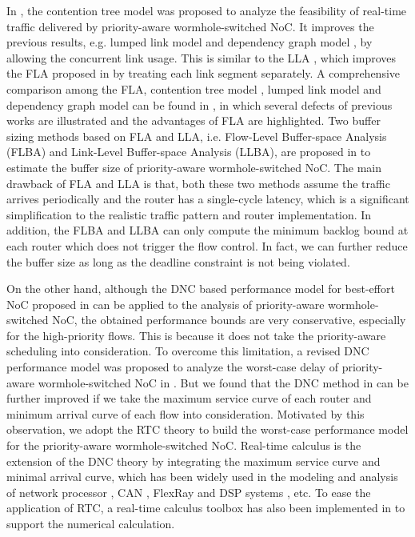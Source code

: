\documentclass[10pt,journal]{IEEEtran}
\begin{document}
In \cite{LuJS05}, the contention tree model was proposed to analyze the feasibility of real-time traffic delivered by priority-aware wormhole-switched NoC. It improves the previous results, e.g. lumped link model \cite{707545} and dependency graph model \cite{708526}, by allowing the concurrent link usage. This is similar to the LLA \cite{73}, which improves the FLA proposed in \cite{Shi:2008:RCA:1397757.1397996} by treating each link segment separately. A comprehensive comparison among the FLA, contention tree model \cite{LuJS05}, lumped link model \cite{707545} and dependency graph model \cite{708526} can be found in \cite{Shi2009}, in which several defects of previous works \cite{LuJS05}\cite{707545}\cite{708526} are illustrated and the advantages of FLA are highlighted. Two buffer sizing methods based on FLA and LLA, i.e. Flow-Level Buffer-space Analysis (FLBA) and Link-Level Buffer-space Analysis (LLBA), are proposed in \cite{189} to estimate the buffer size of priority-aware wormhole-switched NoC. The main drawback of FLA and LLA is that, both these two methods assume the traffic arrives periodically and the router has a single-cycle latency, which is a significant simplification to the realistic traffic pattern and router implementation. In addition, the FLBA and LLBA can only compute the minimum backlog bound at each router which does not trigger the flow control. In fact, we can further reduce the buffer size as long as the deadline constraint is not being violated.

On the other hand, although the DNC based performance model for best-effort NoC proposed in \cite{qian2009analysis} can be applied to the analysis of priority-aware wormhole-switched NoC, the obtained performance bounds are very conservative, especially for the high-priority flows. This is because it does not take the priority-aware scheduling into consideration. To overcome this limitation, a revised DNC performance model was proposed to analyze the worst-case delay of priority-aware wormhole-switched NoC in \cite{Qian489900}. But we found that the DNC method in \cite{Qian489900} can be further improved if we take the maximum service curve of each router and minimum arrival curve of each flow into consideration. Motivated by this observation, we adopt the RTC theory \cite{1253607} to build the worst-case performance model for the priority-aware wormhole-switched NoC. Real-time calculus is the extension of the DNC theory \cite{Boudec2001Network} by integrating the maximum service curve and minimal arrival curve, which has been widely used in the modeling and analysis of network processor \cite{1253838}, CAN \cite{4617308}, FlexRay \cite{Hagiescu:2007:PAF:1278480.1278554} and DSP systems \cite{thiele2005performance}, etc. To ease the application of RTC, a real-time calculus toolbox has also been implemented in \cite{rtc} to support the numerical calculation.
\end{document}

